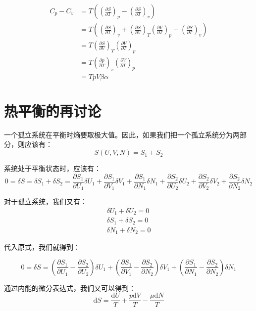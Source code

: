 \documentclass[a4paper, 10pt, openany]{book}%
\begin{document}
\begin{align}
  C_p-C_v&=T\left(\left(\frac{\partial S}{\partial T}\right)_p-\left(\frac{\partial S}{\partial T}\right)_v\right)\\
  &=T\left(\left(\frac{\partial S}{\partial T}\right)_v+\left(\frac{\partial S}{\partial V}\right)_T\left(\frac{\partial V}{\partial T}\right)_p-\left(\frac{\partial S}{\partial T}\right)_v\right)\\
&=T\left(\frac{\partial S}{\partial V}\right)_T\left(\frac{\partial V}{\partial T}\right)_p\\
&=T\left(\frac{\partial p}{\partial T}\right)_v\left(\frac{\partial V}{\partial T}\right)_p\\
&=TpV\beta\alpha
\end{align}

\section{热平衡的再讨论}
一个孤立系统在平衡时熵要取极大值。因此，如果我们把一个孤立系统分为两部分，则应该有：
\begin{equation}
  S(U,V,N)=S_1+S_2
\end{equation}

系统处于平衡状态时，应该有：
\begin{equation}
  0=\delta S=\delta S_1+\delta S_2=\frac{\partial S_1}{\partial U_1}\delta U_1+\frac{\partial S_1}{\partial V_1}\delta V_1+\frac{\partial S_1}{\partial N_1}\delta N_1+\frac{\partial S_2}{\partial U_2}\delta U_2+\frac{\partial S_2}{\partial V_2}\delta V_2+\frac{\partial S_2}{\partial N_2}\delta N_2
\end{equation}

对于孤立系统，我们又有：
\begin{align}
  \delta U_1+\delta U_2=0\\
  \delta S_1+\delta S_2=0\\
  \delta N_1+\delta N_2=0
\end{align}

代入原式，我们就得到：

\begin{equation}
  0=\delta S=\left(\frac{\partial S_1}{\partial U_1}-\frac{\partial S_2}{\partial U_2}\right)\delta U_1+\left(\frac{\partial S_1}{\partial V_1}-\frac{\partial S_2}{\partial N_2}\right)\delta V_1+\left(\frac{\partial S_1}{\partial N_1}-\frac{\partial S_2}{\partial N_2}\right)\delta N_1
\end{equation}

通过内能的微分表达式，我们又可以得到：
\begin{equation}
  \mathrm{d}S=\frac{\mathrm{d}U}{T}+\frac{p\mathrm{d}V}{T}-\frac{\mu \mathrm{d}N}{T}
\end{equation}
\end{document}
